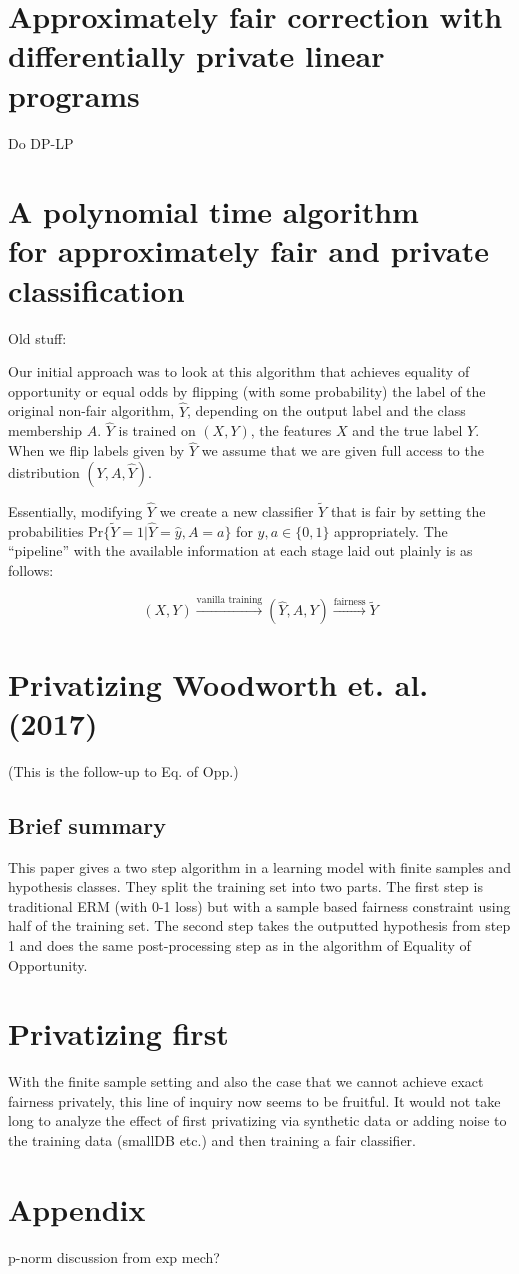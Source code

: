 \documentclass[format = sigconf]{acmart}
\newcommand{\1}{\mathbbm{1}}
\theoremstyle{definition}
\begin{document}
\section{Approximately fair correction with differentially private linear programs}
Do DP-LP

\section{A polynomial time algorithm \\for approximately fair and private classification}
\clearpage

Old stuff:

Our initial approach was to look at this algorithm that achieves equality of opportunity or equal odds by flipping (with some probability) the label of the original non-fair algorithm, $\hat{Y}$, depending on the output label and the class membership $A$. $\hat{Y}$ is trained on $(X,Y)$, the features $X$ and the true label $Y$. When we flip labels given by $\hat{Y}$ we assume that we are given full access to the distribution $(Y,A,\hat{Y})$.

Essentially, modifying $\hat{Y}$ we create a new classifier $\tilde{Y}$ that is fair by setting the probabilities $\text{Pr}\{\tilde{Y} = 1 | \hat{Y} = \hat{y}, A = a \}$ for $\hat{y}, a \in \{0,1\}$ appropriately. The ``pipeline'' with the available information at each stage laid out plainly is as follows:

$$(X,Y) \xrightarrow[]{\text{vanilla training}} (\hat{Y},A,Y) \xrightarrow[]{\text{fairness}} \tilde{Y} $$


\section{Privatizing Woodworth et. al. (2017)}
(This is the follow-up to Eq. of Opp.)

\subsection{Brief summary}
This paper gives a two step algorithm in a learning model with finite samples and hypothesis classes. They split the training set into two parts. The first step is traditional ERM (with 0-1 loss) but with a sample based fairness constraint using half of the training set. The second step takes the outputted hypothesis from step 1 and does the same post-processing step as in the algorithm of Equality of Opportunity.


\section{Privatizing first}
With the finite sample setting and also the case that we cannot achieve exact fairness privately, this line of inquiry now seems to be fruitful. It would not take long to analyze the effect of first privatizing via synthetic data or adding noise to the training data (smallDB etc.) and then training a fair classifier.

\section{Appendix}
p-norm discussion from exp mech?
\end{document}
